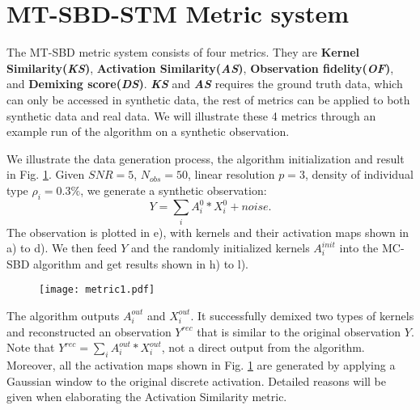 \section{MT-SBD-STM Metric system}
The MT-SBD metric system consists of four metrics. They are \textbf{Kernel Similarity(\textit{KS})}, \textbf{Activation Similarity(\textit{AS})}, \textbf{Observation fidelity(\textit{OF})}, and \textbf{Demixing score(\textit{DS})}. \textbf{\textit{KS}} and \textbf{\textit{AS}} requires the ground truth data, which can only be accessed in synthetic data, the rest of metrics can be applied to both synthetic data and real data. We will illustrate these 4 metrics through an example run of the algorithm on a synthetic observation. 

We illustrate the data generation process, the algorithm initialization and result in Fig. \ref{fig:metric}. Given $SNR = 5$, $N_{obs}=50$, linear resolution $p = 3$, density of individual type $\rho_i = 0.3\%$, we generate a synthetic observation: 
\begin{equation}
	\label{eq:observation}
	Y = \sum_i A^0_i * X^0_i + noise.
\end{equation} The observation is plotted in e), with kernels and their activation maps shown in a) to d). We then feed $Y$ and the randomly initialized kernels $A_i^{init}$ into the \ac{MC-SBD} algorithm and get results shown in h) to l). 

\begin{figure}
	\texttt{[image: metric1.pdf]} 
	\centering
	\caption{}
	\label{fig:metric}
\end{figure}

The algorithm outputs $A_i^{out}$ and $X_i^{out}$. It successfully demixed two types of kernels and reconstructed an observation $Y^{rec}$ that is similar to the original observation $Y$. Note that $Y^{rec} = \sum_i A^{out}_i * X^{out}_i$, not a direct output from the algorithm. Moreover, all the activation maps shown in Fig. \ref{fig:metric} are generated by applying a Gaussian window to the original discrete activation. Detailed reasons will be given when elaborating the Activation Similarity metric. 

